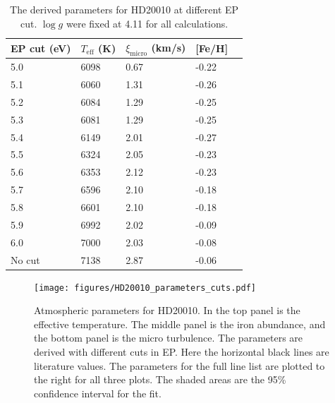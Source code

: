 \documentclass{aa}
\begin{document}
\begin{table}[htb!]
    \caption{The derived parameters for HD20010 at different EP cut. $\log g$
    were fixed at 4.11 for all calculations.}
    \label{tab:hd20010}
    \centering
    \begin{tabular}{lllll}
      \hline\hline
        EP cut (eV) & $T_\mathrm{eff}$ (K) & $\xi_\mathrm{micro}$ (km/s) & [Fe/H] \\
      \hline
      5.0           & 6098                 & 0.67                        & -0.22   \\
      5.1           & 6060                 & 1.31                        & -0.26   \\
      5.2           & 6084                 & 1.29                        & -0.25   \\
      5.3           & 6081                 & 1.29                        & -0.25   \\
      5.4           & 6149                 & 2.01                        & -0.27   \\
      5.5           & 6324                 & 2.05                        & -0.23   \\
      5.6           & 6353                 & 2.12                        & -0.23   \\
      5.7           & 6596                 & 2.10                        & -0.18   \\
      5.8           & 6601                 & 2.10                        & -0.18   \\
      5.9           & 6992                 & 2.02                        & -0.09   \\
      6.0           & 7000                 & 2.03                        & -0.08   \\
      No cut        & 7138                 & 2.87                        & -0.06   \\
      \hline
    \end{tabular}
\end{table}


\begin{figure}[tpb!]
    \centering
    \texttt{[image: figures/HD20010\_parameters\_cuts.pdf]}
    \caption{Atmospheric parameters for HD20010. In the top panel is
    the effective temperature. The middle panel is the iron abundance,
    and the bottom panel is the micro turbulence. The parameters are
    derived with different cuts in EP. Here the horizontal black lines
    are literature values. The parameters for the full line list are
    plotted to the right for all three plots. The shaded areas are the
    95\% confidence interval for the fit.}
    \label{fig:HD20010_parameters_cuts}
\end{figure}











\newpage


\nocite*{}
\end{document}
